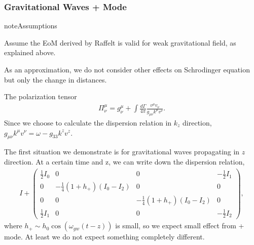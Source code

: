 \documentclass[letterpaper,12pt,english]{sphinxmanual}
\begin{document}
\subsubsection{Gravitational Waves + Mode}
\label{\detokenize{gravity/gravitational-waves:gravitational-waves-mode}}
\begin{sphinxadmonition}{note}{Assumptions}

Assume the EoM derived by Raffelt is valid for weak gravitational field, as explained above.

As an approximation, we do not consider other effects on Schrodinger equation but only the change in distances.
\end{sphinxadmonition}

The polarization tensor
\begin{equation*}
\begin{split}\Pi^\mu_\nu = g^\mu_\nu + \int \frac{d\Gamma}{4\pi} \frac{v^\mu v_\nu}{g_{\mu\nu}k^\mu v^\nu}.\end{split}
\end{equation*}
Since we choose to calculate the dispersion relation in \(k_z\) direction, \(g_{\mu\nu}k^\mu v^\nu=\omega - g_{33} k^z v^z\).

The first situation we demonstrate is for gravitational waves propagating in \(z\) direction. At a certain time and z, we can write down the dispersion relation,
\begin{equation*}
\begin{split}I + \begin{pmatrix}
\frac{1}{2} I_0 & 0 & 0 & -\frac{1}{2}I_1\\
0 & -\frac{1}{4}(1+h_+) (I_0-I_2) & 0  & 0 \\
0 & 0 & -\frac{1}{4}(1+h_+) (I_0-I_2) & 0  \\
\frac{1}{2}I_1 & 0 & 0 & -\frac{1}{2}I_2
\end{pmatrix},\end{split}
\end{equation*}
where \(h_+\sim h_0 \cos (\omega_{gw}(t-z))\) is small, so we expect small effect from + mode. At least we do not expect something completely different.
\end{document}

